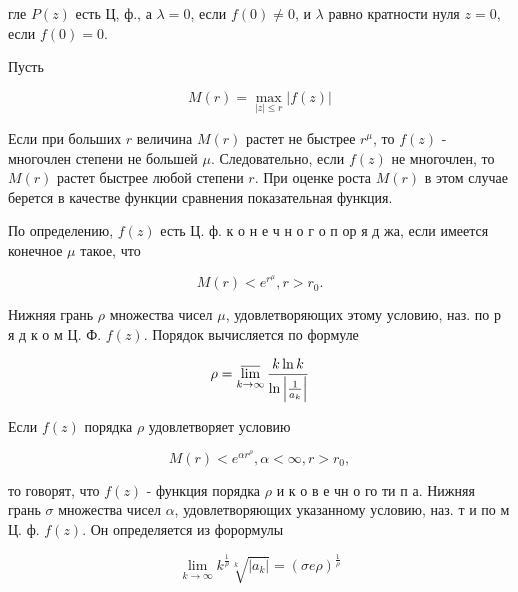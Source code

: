 \documentclass[10pt]{article}
\begin{document}
гле $P(z)$ есть Ц, ф., а $\lambda=0$, если $f(0) \neq 0$, и $\lambda$ равно кратности нуля $z=0$, если $f(0)=0$.



Пусть



\[

M(r)=\max _{|z| \leqslant r}|f(z)|

\]



Если при больших $r$ величина $M(r)$ растет не быстрее $r^{\mu}$, то $f(z)$ - многочлен степени не большей $\mu$. Следовательно, если $f(z)$ не многочлен, то $M(r)$ растет быстрее любой степени $r$. При оценке роста $M(r)$ в этом случае берется в качестве функции сравнения показательная функция.



По определению, $f(z)$ есть Ц. ф. к о н е ч н о г о п ор я д жа, если имеется конечное $\mu$ такое, что



\[

M(r)<e^{r^{\mu}}, r>r_{0} .

\]



Нижняя грань $\rho$ множества чисел $\mu$, удовлетворяющих этому условию, наз. по р я д к о м Ц. Ф. $f(z)$. Порядок вычисляется по формуле



\[

\rho=\varlimsup_{k \rightarrow \infty} \frac{k \ln k}{\ln \left|\frac{1}{a_{k}}\right|}

\]



Если $f(z)$ порядка $\rho$ удовлетворяет условию



\[

M(r)<e^{\alpha r^{\rho}}, \alpha<\infty, r>r_{0},

\]



то говорят, что $f(z)$ - функция порядка $\rho$ и к о в е чн о го ти п а. Нижняя грань $\sigma$ множества чисел $\alpha$, удовлетворяющих указанному условию, наз. т и по м Ц. ф. $f(z)$. Он определяется из форормулы



\[

\lim _{k \rightarrow \infty} k^{\frac{1}{\rho}} \sqrt[k]{\left|a_{k}\right|}=(\sigma e \rho)^{\frac{1}{\rho}}

\]
\end{document}
